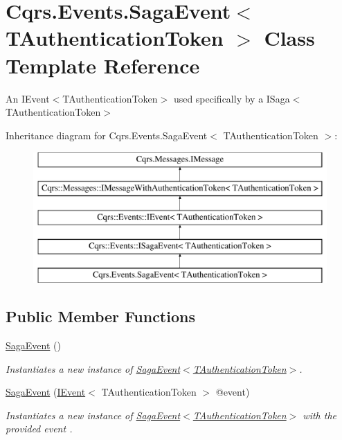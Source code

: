 \hypertarget{classCqrs_1_1Events_1_1SagaEvent}{}\section{Cqrs.\+Events.\+Saga\+Event$<$ T\+Authentication\+Token $>$ Class Template Reference}
\label{classCqrs_1_1Events_1_1SagaEvent}


An I\+Event$<$\+T\+Authentication\+Token$>$ used specifically by a I\+Saga$<$\+T\+Authentication\+Token$>$  


Inheritance diagram for Cqrs.\+Events.\+Saga\+Event$<$ T\+Authentication\+Token $>$\+:\begin{figure}[H]
\begin{center}
\leavevmode
\includegraphics[height=5.000000cm]{classCqrs_1_1Events_1_1SagaEvent}
\end{center}
\end{figure}
\subsection*{Public Member Functions}
\begin{DoxyCompactItemize}
\item 
\hyperlink{classCqrs_1_1Events_1_1SagaEvent_a658ce04baccb816bf132702cccaa6a90_a658ce04baccb816bf132702cccaa6a90}{Saga\+Event} ()
\begin{DoxyCompactList}\small\item\em Instantiates a new instance of \hyperlink{classCqrs_1_1Events_1_1SagaEvent_a658ce04baccb816bf132702cccaa6a90_a658ce04baccb816bf132702cccaa6a90}{Saga\+Event$<$\+T\+Authentication\+Token$>$}. \end{DoxyCompactList}\item 
\hyperlink{classCqrs_1_1Events_1_1SagaEvent_aeb42f8e8f8e18bffe0dbe55b3da3c476_aeb42f8e8f8e18bffe0dbe55b3da3c476}{Saga\+Event} (\hyperlink{interfaceCqrs_1_1Events_1_1IEvent}{I\+Event}$<$ T\+Authentication\+Token $>$ @event)
\begin{DoxyCompactList}\small\item\em Instantiates a new instance of \hyperlink{classCqrs_1_1Events_1_1SagaEvent_a658ce04baccb816bf132702cccaa6a90_a658ce04baccb816bf132702cccaa6a90}{Saga\+Event$<$\+T\+Authentication\+Token$>$} with the provided {\itshape event} . \end{DoxyCompactList}\end{DoxyCompactItemize}
